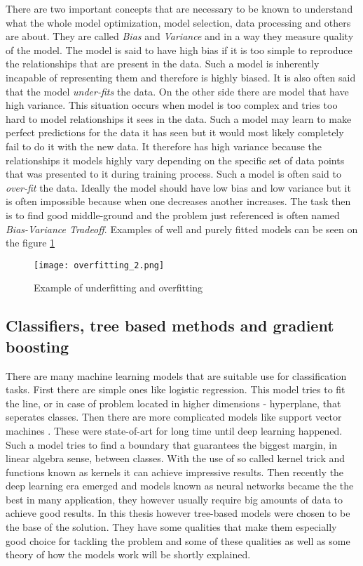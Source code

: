 \documentclass[a4paper,twoside,12pt]{book}
\newcommand*\setcaptioncitation[1]{\def\captioncitation{\textit{Source:}~#1}}
\let\captioncitation\relax
\begin{document}
There are two important concepts that are necessary to be known to understand what the whole model optimization, model selection, data processing and others are about. They are called \emph{Bias} and \emph{Variance} and in a way they measure quality of the model.
The model is said to have high bias if it is too simple to reproduce the relationships that are present in the data. Such a model is inherently incapable of representing them and therefore is highly biased. It is also often said that the model \emph{under-fits} the data. On the other side there are model that have high variance. This situation occurs when model is too complex and  tries too hard to model relationships it sees in the data. Such a model may learn to make perfect predictions for the data it has seen but it would most likely completely fail to do it with the new data. It therefore has high variance because the relationships it models highly vary depending on the specific set of data points that was presented to it during training process. Such a model is often said to \emph{over-fit} the data.
Ideally the model should have low bias and low variance but it is often impossible because when one decreases another increases. The task then is to find good middle-ground and the problem just referenced is often named \emph{Bias-Variance Tradeoff}. Examples of well and purely fitted models can be seen on the figure \ref{fitting}

\begin{figure}[ht]
  \centering
  \texttt{[image: overfitting\_2.png]}
  \setcaptioncitation{\url{https://cutt.ly/4jaUM7Y}}
  \caption{Example of underfitting and overfitting}
  \label{fitting}
\end{figure}

\subsection{Classifiers, tree based methods and gradient boosting}

There are many machine learning models that are suitable use for classification tasks. First there are simple ones like logistic regression\cite{wright1995logistic}. This model tries to fit the line, or in case of problem located in higher dimensions - hyperplane, that seperates classes. Then there are more complicated models like support vector machines \cite{noble2006support}. These were state-of-art for long time until deep learning\cite{goodfellow2016deep} happened. Such a model tries to find a boundary that guarantees the biggest margin, in linear algebra sense, between classes. With the use of so called kernel trick and functions known as kernels it can achieve impressive results. Then recently the deep learning era emerged and models known as neural networks became the the best in many application, they however usually require big amounts of data to achieve good results.
In this thesis however tree-based models\cite{buntine1992learning} were chosen to be the base of the solution. They have some qualities that make them especially good choice for tackling the problem and some of these qualities as well as some theory of how the models work will be shortly explained.
\end{document}
